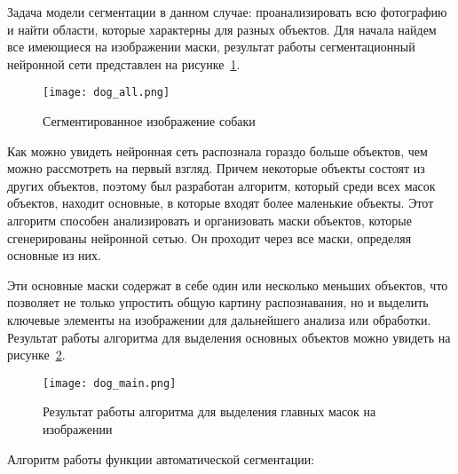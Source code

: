 Задача модели сегментации в данном случае: проанализировать всю 
фотографию и найти области, которые характерны для разных объектов. Для 
начала найдем все имеющиеся на изображении маски, результат работы 
сегментационный нейронной сети представлен на рисунке~\ref{dev::dog_all}.

\begin{figure}[ht]
    \centering
    \texttt{[image: dog\_all.png]}
    \caption{Сегментированное изображение собаки}
    \label{dev::dog_all}
\end{figure}

Как можно увидеть нейронная сеть распознала гораздо больше объектов, 
чем можно рассмотреть на первый взгляд. Причем некоторые объекты состоят 
из других объектов, поэтому был разработан алгоритм, который среди всех 
масок объектов, находит основные, в которые входят более маленькие 
объекты. Этот алгоритм способен анализировать и организовать маски объектов, которые сгенерированы нейронной сетью. Он проходит через все маски, определяя основные из них. 

Эти основные маски содержат в себе один или несколько меньших объектов, что позволяет не только упростить общую картину распознавания, но и выделить ключевые элементы на изображении для дальнейшего анализа или обработки. Результат работы алгоритма для выделения основных объектов 
можно увидеть на рисунке~\ref{dev::dog_main}.

\begin{figure}[ht]
    \centering
    \texttt{[image: dog\_main.png]}
    \caption{Результат работы алгоритма для выделения главных масок на изображении}
    \label{dev::dog_main}
\end{figure}

Алгоритм работы функции автоматической сегментации:

